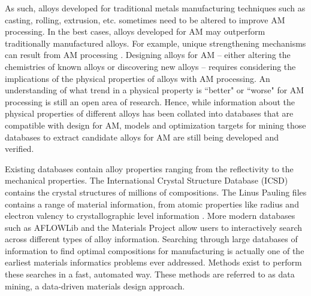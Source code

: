 As such, alloys developed for traditional metals manufacturing techniques such as casting, rolling, extrusion, etc. sometimes need to be altered to improve AM processing. In the best cases, alloys developed for AM may outperform traditionally manufactured alloys. For example, unique strengthening mechanisms can result from AM processing \cite{Brice2018, Wang2017, Martin2017, Gallmeyer2019}. Designing alloys for AM -- either altering the chemistries of known alloys or discovering new alloys -- requires considering the implications of the physical properties of alloys with AM processing. An understanding of what trend in a physical property is ``better" or ``worse" for AM processing is still an open area of research. Hence, while information about the physical properties of different alloys has been collated into databases that are compatible with design for AM, models and optimization targets for mining those databases to extract candidate alloys for AM are still being developed and verified. 

Existing databases contain alloy properties ranging from the reflectivity to the mechanical properties. The International Crystal Structure Database (ICSD) contains the crystal structures of millions of compositions. The Linus Pauling files contains a range of material information, from atomic properties like radius and electron valency to crystallographic level information \cite{Villars1998}. More modern databases such as AFLOWLib \cite{Curtarolo2012a} and the Materials Project \cite{Jain2013} allow users to interactively search across different types of alloy information. Searching through large databases of information to find optimal compositions for manufacturing is actually one of the earliest materials informatics problems ever addressed. Methods exist to perform these searches in a fast, automated way. These methods are referred to as data mining, a data-driven materials design approach.

